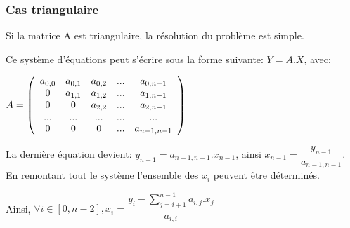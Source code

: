 \begin{frame}[fragile]
\frametitle{Cas triangulaire}

Si la matrice A est triangulaire, la résolution du problème est simple.

Ce système d'équations peut s'écrire sous la forme suivante: $Y=A.X$, avec:\\
\begin{center}
$A=\left(\begin{array}{c c c c c}
a_{0,0} & a_{0,1} & a_{0,2} & ... & a_{0,n-1} \\
0 & a_{1,1} & a_{1,2} & ... & a_{1,n-1} \\
0 & 0 & a_{2,2} & ... & a_{2,n-1} \\
... & ... & ... & ... & ... \\
0 & 0 & 0 & ... & a_{n-1,n-1}
\end{array}\right)$
\end{center}

La dernière équation devient: $y_{n-1}=a_{n-1,n-1}.x_{n-1}$, ainsi $x_{n-1}=\dfrac{y_{n-1}}{a_{n-1,n-1}}$. En remontant tout le système l'ensemble des $x_i$ peuvent être déterminés.

Ainsi, $\forall i \in [0,n-2], x_i=\dfrac{y_i-\sum \limits_{j=i+1}^{n-1} a_{i,j}.x_j}{a_{i,i}}$

\end{frame}

